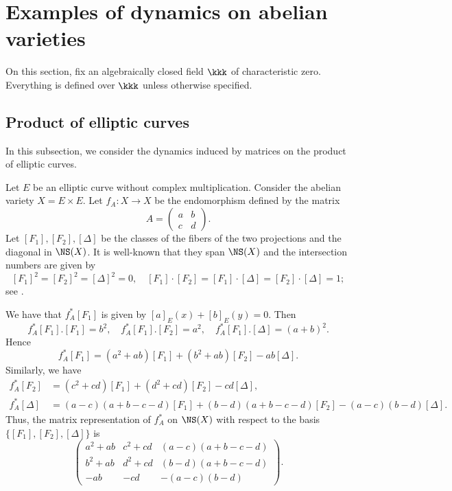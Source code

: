 \section{Examples of dynamics on abelian varieties}

On this section, fix an algebraically closed field \(\kkk\) of characteristic zero.
Everything is defined over \(\kkk\) unless otherwise specified. 

\subsection{Product of elliptic curves}

    In this subsection, we consider the dynamics induced by matrices on the product of elliptic curves.

    \begin{example}\label{eg:dynamics_induced_by_matrix_on_product_of_elliptic_curves}
        Let \(E\) be an elliptic curve without complex multiplication. 
        Consider the abelian variety \(X = E \times E\). 
        Let \(f_A: X \to X\) be the endomorphism defined by the matrix
        \[ A = \begin{pmatrix}
            a & b \\
            c & d
        \end{pmatrix}. \]
        Let \([F_1], [F_2], [\Delta]\) be the classes of the fibers of the two projections and the diagonal in \(\NS(X)\).
        It is well-known that they span \(\NS(X)\) and the intersection numbers are given by
        \[ [F_1]^2 = [F_2]^2 = [\Delta]^2 = 0, \quad [F_1] \cdot [F_2] = [F_1] \cdot [\Delta] = [F_2] \cdot [\Delta] = 1; \]
        see \cite[Section 1.5.B]{Laz04a}.

        We have that \(f_A^*[F_1]\) is given by \([a]_E (x) + [b]_E (y) = 0\).
        Then 
        \[ f_A^*[F_1].[F_1] = b^2, \quad f_A^*[F_1].[F_2] = a^2, \quad f_A^*[F_1].[\Delta] = (a+b)^2. \]
        Hence 
        \[ f_A^*[F_1] = (a^2+ab) [F_1] + (b^2+ab) [F_2] - ab [\Delta]. \]
        Similarly, we have
        \begin{align*}
            f_A^*[F_2] &= (c^2+cd) [F_1] + (d^2+cd) [F_2] - cd [\Delta], \\
            f_A^*[\Delta] &= (a-c)(a+b-c-d) [F_1] + (b-d)(a+b-c-d) [F_2] - (a-c)(b-d) [\Delta].
        \end{align*}
        Thus, the matrix representation of \(f_A^*\) on \(\NS(X)\) with respect to the basis \(\{[F_1], [F_2], [\Delta]\}\) is
        \[
            \begin{pmatrix}
                a^2+ab & c^2+cd & (a-c)(a+b-c-d) \\
                b^2+ab & d^2+cd & (b-d)(a+b-c-d) \\
                -ab & -cd & -(a-c)(b-d)
            \end{pmatrix}.
        \]


\end{example}
